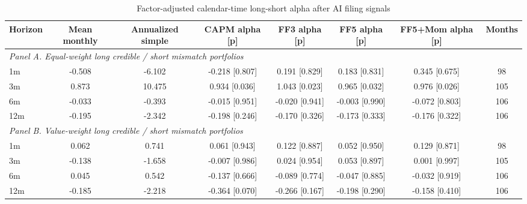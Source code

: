 \begin{table}[!htbp]
\centering
\caption{Factor-adjusted calendar-time long-short alpha after AI filing signals}
\label{tab:factor_adjusted_alpha_v31}
\begin{tabular}{lccccccc}
\hline
Horizon & Mean monthly & Annualized simple & CAPM alpha [p] & FF3 alpha [p] & FF5 alpha [p] & FF5+Mom alpha [p] & Months \\
\hline
\multicolumn{8}{l}{\textit{Panel A. Equal-weight long credible / short mismatch portfolios}} \\
1m & -0.508 & -6.102 & -0.218 [0.807] & 0.191 [0.829] & 0.183 [0.831] & 0.345 [0.675] & 98 \\
3m & 0.873 & 10.475 & 0.934 [0.036] & 1.043 [0.023] & 0.965 [0.032] & 0.976 [0.026] & 105 \\
6m & -0.033 & -0.393 & -0.015 [0.951] & -0.020 [0.941] & -0.003 [0.990] & -0.072 [0.803] & 106 \\
12m & -0.195 & -2.342 & -0.198 [0.246] & -0.170 [0.326] & -0.173 [0.333] & -0.176 [0.322] & 106 \\
\hline
\multicolumn{8}{l}{\textit{Panel B. Value-weight long credible / short mismatch portfolios}} \\
1m & 0.062 & 0.741 & 0.061 [0.943] & 0.122 [0.887] & 0.052 [0.950] & 0.129 [0.871] & 98 \\
3m & -0.138 & -1.658 & -0.007 [0.986] & 0.024 [0.954] & 0.053 [0.897] & 0.001 [0.997] & 105 \\
6m & 0.045 & 0.542 & -0.137 [0.666] & -0.089 [0.774] & -0.047 [0.885] & -0.032 [0.919] & 106 \\
12m & -0.185 & -2.218 & -0.364 [0.070] & -0.266 [0.167] & -0.198 [0.290] & -0.158 [0.410] & 106 \\
\hline
\end{tabular}
\end{table}
